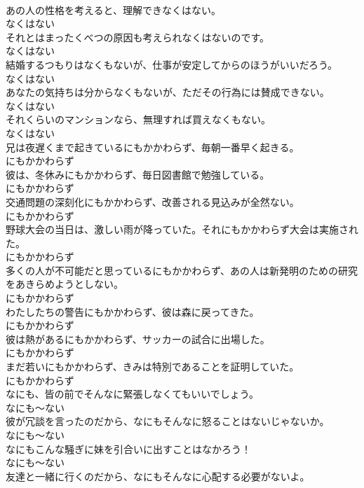 \documentclass[8pt]{extreport}
\begin{document}
\begin{CJK}{UTF8}{min}
\\	あの人の性格を考えると、理解できなくはない。	
\\	なくはない
\\	それとはまったくべつの原因も考えられなくはないのです。	
\\	なくはない
\\	結婚するつもりはなくもないが、仕事が安定してからのほうがいいだろう。	
\\	なくはない
\\	あなたの気持ちは分からなくもないが、ただその行為には賛成できない。	
\\	なくはない
\\	それくらいのマンションなら、無理すれば買えなくもない。	
\\	なくはない
\\	兄は夜遅くまで起きているにもかかわらず、毎朝一番早く起きる。	
\\	にもかかわらず
\\	彼は、冬休みにもかかわらず、毎日図書館で勉強している。	
\\	にもかかわらず
\\	交通問題の深刻化にもかかわらず、改善される見込みが全然ない。	
\\	にもかかわらず
\\	野球大会の当日は、激しい雨が降っていた。それにもかかわらず大会は実施された。	
\\	にもかかわらず
\\	多くの人が不可能だと思っているにもかかわらず、あの人は新発明のための研究をあきらめようとしない。	
\\	にもかかわらず
\\	わたしたちの警告にもかかわらず、彼は森に戻ってきた。	
\\	にもかかわらず
\\	彼は熱があるにもかかわらず、サッカーの試合に出場した。	
\\	にもかかわらず
\\	まだ若いにもかかわらず、きみは特別であることを証明していた。	
\\	にもかかわらず
\\	なにも、皆の前でそんなに緊張しなくてもいいでしょう。	
\\	なにも～ない
\\	彼が冗談を言ったのだから、なにもそんなに怒ることはないじゃないか。	
\\	なにも～ない
\\	なにもこんな騒ぎに妹を引合いに出すことはなかろう！	
\\	なにも～ない
\\	友達と一緒に行くのだから、なにもそんなに心配する必要がないよ。	

\end{CJK}
\end{document}
